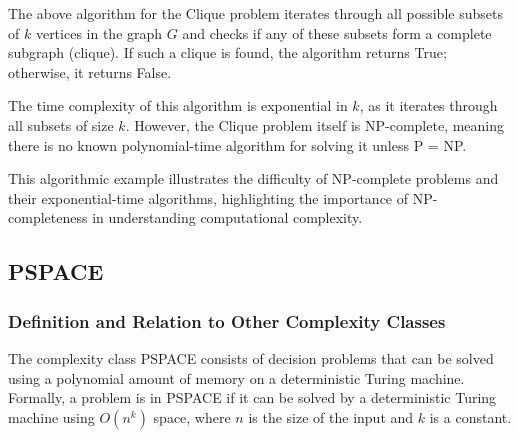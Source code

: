 \documentclass[12pt]{book} %
\begin{document}
The above algorithm for the Clique problem iterates through all possible subsets of \(k\) vertices in the graph \(G\) and checks if any of these subsets form a complete subgraph (clique). If such a clique is found, the algorithm returns True; otherwise, it returns False.

The time complexity of this algorithm is exponential in \(k\), as it iterates through all subsets of size \(k\). However, the Clique problem itself is NP-complete, meaning there is no known polynomial-time algorithm for solving it unless P = NP.

This algorithmic example illustrates the difficulty of NP-complete problems and their exponential-time algorithms, highlighting the importance of NP-completeness in understanding computational complexity.


\subsection{PSPACE}

\subsubsection{Definition and Relation to Other Complexity Classes}
The complexity class PSPACE consists of decision problems that can be solved using a polynomial amount of memory on a deterministic Turing machine. Formally, a problem is in PSPACE if it can be solved by a deterministic Turing machine using \(O(n^k)\) space, where \(n\) is the size of the input and \(k\) is a constant.
\end{document}
